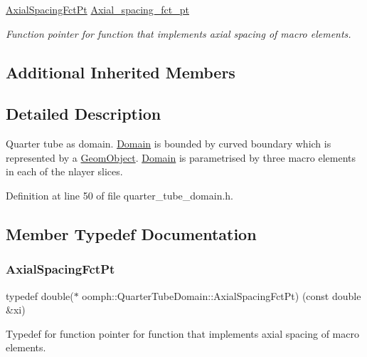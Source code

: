 \begin{DoxyCompactItemize}
\hyperlink{classoomph_1_1QuarterTubeDomain_ae347af42a5dcb9b3b82c2247975b01db}{Axial\+Spacing\+Fct\+Pt} \hyperlink{classoomph_1_1QuarterTubeDomain_ad084b0e50d50b1948c2e9a600e3dcbd0}{Axial\+\_\+spacing\+\_\+fct\+\_\+pt}
\begin{DoxyCompactList}\small\item\em Function pointer for function that implements axial spacing of macro elements. \end{DoxyCompactList}\end{DoxyCompactItemize}
\subsection*{Additional Inherited Members}


\subsection{Detailed Description}
Quarter tube as domain. \hyperlink{classoomph_1_1Domain}{Domain} is bounded by curved boundary which is represented by a \hyperlink{classoomph_1_1GeomObject}{Geom\+Object}. \hyperlink{classoomph_1_1Domain}{Domain} is parametrised by three macro elements in each of the nlayer slices. 

Definition at line 50 of file quarter\+\_\+tube\+\_\+domain.\+h.



\subsection{Member Typedef Documentation}
\mbox{\label{classoomph_1_1QuarterTubeDomain_ae347af42a5dcb9b3b82c2247975b01db}} 
\subsubsection{\texorpdfstring{Axial\+Spacing\+Fct\+Pt}{AxialSpacingFctPt}}
{\footnotesize\ttfamily typedef double($\ast$ oomph\+::\+Quarter\+Tube\+Domain\+::\+Axial\+Spacing\+Fct\+Pt) (const double \&xi)}



Typedef for function pointer for function that implements axial spacing of macro elements. 



